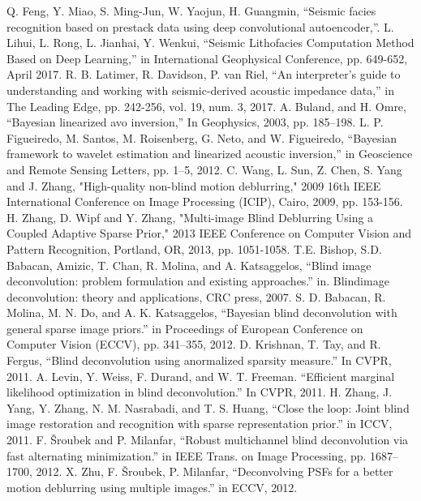 \documentclass[conference]{IEEEtran}
\begin{document}
\begin{thebibliography}{00}
			Q. Feng, Y. Miao, S. Ming-Jun, W. Yaojun, H. Guangmin, ``Seismic facies recognition based on prestack data using deep convolutional autoencoder,''.
 			L. Lihui, L. Rong, L. Jianhai, Y. Wenkui, ``Seismic Lithofacies Computation Method Based on Deep Learning,'' in International Geophysical Conference, pp. 649-652, April 2017.
 		R. B. Latimer, R. Davidson, P. van Riel, ``An interpreter's guide to understanding and working with seismic-derived acoustic impedance data,'' in The Leading Edge, pp. 242-256, vol. 19, num. 3, 2017.
		A. Buland,  and H. Omre, ``Bayesian linearized avo inversion,'' In Geophysics, 2003, pp. 185–198.
	L. P. Figueiredo, M. Santos, M. Roisenberg, G. Neto, and W. Figueiredo, ``Bayesian framework to wavelet estimation and linearized acoustic inversion,'' in Geoscience and Remote Sensing Letters, pp. 1–5, 2012.
		C. Wang, L. Sun, Z. Chen, S. Yang and J. Zhang, "High-quality non-blind motion deblurring," 2009 16th IEEE International Conference on Image Processing (ICIP), Cairo, 2009, pp. 153-156.
		H. Zhang, D. Wipf and Y. Zhang, "Multi-image Blind Deblurring Using a Coupled Adaptive Sparse Prior," 2013 IEEE Conference on Computer Vision and Pattern Recognition, Portland, OR, 2013, pp. 1051-1058.
		T.E. Bishop, S.D. Babacan, Amizic, T. Chan, R. Molina, and A. Katsaggelos, ``Blind image deconvolution: problem formulation and existing approaches.'' in. Blindimage deconvolution: theory and applications,  CRC press, 2007.
		S. D. Babacan, R. Molina, M. N. Do, and A. K. Katsaggelos, ``Bayesian blind deconvolution with general sparse image priors.'' in Proceedings of European Conference on Computer Vision (ECCV), pp. 341–355, 2012.
		D. Krishnan, T. Tay, and R. Fergus, ``Blind deconvolution using anormalized sparsity measure.'' In CVPR, 2011.
		A. Levin, Y. Weiss, F. Durand, and W. T. Freeman. ``Efficient marginal likelihood optimization in blind deconvolution.'' In CVPR, 2011.
		H. Zhang, J. Yang, Y. Zhang, N. M. Nasrabadi, and T. S. Huang, ``Close the loop: Joint blind image restoration and recognition with sparse representation prior.'' in ICCV, 2011. 
		F. Šroubek and P. Milanfar, ``Robust multichannel blind deconvolution via fast alternating minimization.'' in IEEE Trans. on Image Processing, pp. 1687–1700, 2012.
		X. Zhu, F. Šroubek, P. Milanfar, ``Deconvolving PSFs for a better motion deblurring using multiple images.'' in ECCV, 2012.

\end{thebibliography}
\end{document}
